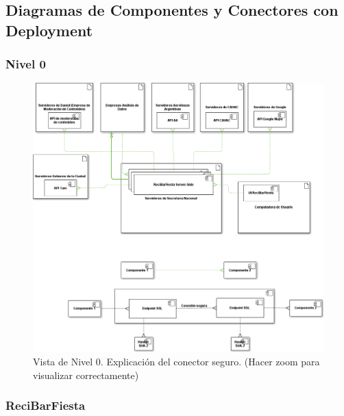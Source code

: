 \subsection{Diagramas de Componentes y Conectores con Deployment}

\subsubsection{Nivel 0}

\begin{figure}[H]
  \centering
  \includegraphics[width=\textwidth]{diagramas/Nivel0.png}
  \caption{\normalfont Vista de Nivel 0. Explicación del conector seguro. (Hacer zoom para visualizar correctamente)}
\end{figure} 


\subsubsection{ReciBarFiesta}

